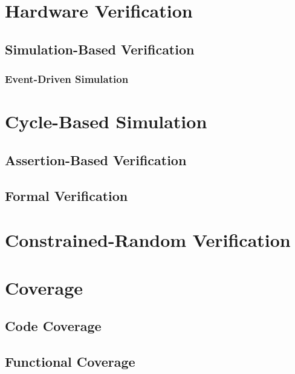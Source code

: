 \documentclass[11pt]{book}
\begin{document}
\section{Hardware Verification}

\subsection{Simulation-Based Verification}

\subsubsection{Event-Driven Simulation}

\section{Cycle-Based Simulation}

\subsection{Assertion-Based Verification}

\subsection{Formal Verification}

\section{Constrained-Random Verification} %

\cite{Mehta2021}

\section{Coverage} %

\subsection{Code Coverage}

\subsection{Functional Coverage}
\end{document}
